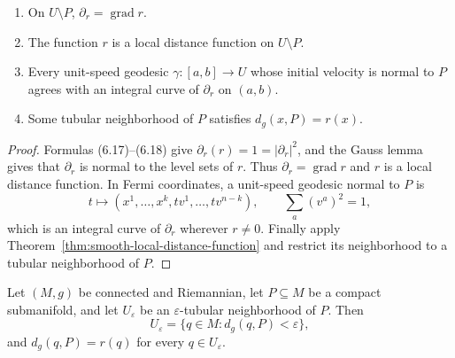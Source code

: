 \begin{corollary}
\label{cor:distance-function-local-properties}

\begin{enumerate}
\item[(a)] On $U\setminus P$, $\partial_r=\operatorname{grad}r$.
\item[(b)] The function $r$ is a local distance function on $U\setminus P$.
\item[(c)] Every unit-speed geodesic $\gamma:[a,b]\to U$ whose initial
velocity is normal to $P$ agrees with an integral curve of $\partial_r$ on
$(a,b)$.
\item[(d)] Some tubular neighborhood of $P$ satisfies
$d_g(x,P)=r(x)$.
\end{enumerate}
\end{corollary}

\begin{proof}
\sketch Formulas (6.17)--(6.18) give
$\partial_r(r)=1=|\partial_r|^2$, and the Gauss lemma gives that
$\partial_r$ is normal to the level sets of $r$. Thus
$\partial_r=\operatorname{grad}r$ and $r$ is a local distance function.
In Fermi coordinates, a unit-speed geodesic normal to $P$ is
\[
t\longmapsto(x^1,\ldots,x^k,tv^1,\ldots,tv^{n-k}),
\qquad \sum_a(v^a)^2=1,
\]
which is an integral curve of $\partial_r$ wherever $r\neq0$. Finally apply
Theorem~\ref{thm:smooth-local-distance-function} and restrict its neighborhood
to a tubular neighborhood of $P$.
\end{proof}

\begin{theorem}
\label{thm:tubular-neighborhood-metric-distance}

Let $(M,g)$ be connected and Riemannian, let $P\subseteq M$ be a compact
submanifold, and let $U_\varepsilon$ be an $\varepsilon$-tubular neighborhood
of $P$. Then
\[
U_\varepsilon=\{q\in M:d_g(q,P)<\varepsilon\},
\]
and $d_g(q,P)=r(q)$ for every $q\in U_\varepsilon$.
\end{theorem}

